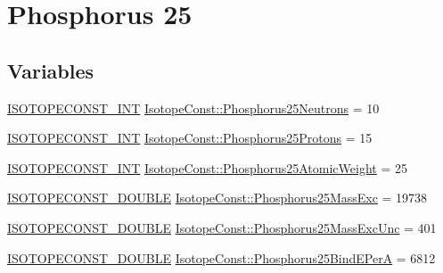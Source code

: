 \hypertarget{group___isotope_const-_phosphorus-_p25}{}\section{Phosphorus 25}
\label{group___isotope_const-_phosphorus-_p25}
\subsection*{Variables}
\begin{DoxyCompactItemize}
\item 
\mbox{\hyperlink{group___isotope_const-_macros_ga5f18360b3e99483a35c32d789e62621c}{I\+S\+O\+T\+O\+P\+E\+C\+O\+N\+S\+T\+\_\+\+I\+NT}} \mbox{\hyperlink{group___isotope_const-_phosphorus-_p25_ga174043ce307d1d3e2aba5b29657a9403}{Isotope\+Const\+::\+Phosphorus25\+Neutrons}} = 10
\item 
\mbox{\hyperlink{group___isotope_const-_macros_ga5f18360b3e99483a35c32d789e62621c}{I\+S\+O\+T\+O\+P\+E\+C\+O\+N\+S\+T\+\_\+\+I\+NT}} \mbox{\hyperlink{group___isotope_const-_phosphorus-_p25_ga80e4c9d7c91250db139273bf77041306}{Isotope\+Const\+::\+Phosphorus25\+Protons}} = 15
\item 
\mbox{\hyperlink{group___isotope_const-_macros_ga5f18360b3e99483a35c32d789e62621c}{I\+S\+O\+T\+O\+P\+E\+C\+O\+N\+S\+T\+\_\+\+I\+NT}} \mbox{\hyperlink{group___isotope_const-_phosphorus-_p25_ga40ed02d9787d031adb076afaa76d43f8}{Isotope\+Const\+::\+Phosphorus25\+Atomic\+Weight}} = 25
\item 
\mbox{\hyperlink{group___isotope_const-_macros_ga8f45a7272ce02c0b4c65c44636ed719a}{I\+S\+O\+T\+O\+P\+E\+C\+O\+N\+S\+T\+\_\+\+D\+O\+U\+B\+LE}} \mbox{\hyperlink{group___isotope_const-_phosphorus-_p25_ga3c2e94951ce2a847d5fe7a45ca7b48d3}{Isotope\+Const\+::\+Phosphorus25\+Mass\+Exc}} = 19738
\item 
\mbox{\hyperlink{group___isotope_const-_macros_ga8f45a7272ce02c0b4c65c44636ed719a}{I\+S\+O\+T\+O\+P\+E\+C\+O\+N\+S\+T\+\_\+\+D\+O\+U\+B\+LE}} \mbox{\hyperlink{group___isotope_const-_phosphorus-_p25_gae99510d1266b5da8f0795c7d077b4fc6}{Isotope\+Const\+::\+Phosphorus25\+Mass\+Exc\+Unc}} = 401
\item 
\mbox{\hyperlink{group___isotope_const-_macros_ga8f45a7272ce02c0b4c65c44636ed719a}{I\+S\+O\+T\+O\+P\+E\+C\+O\+N\+S\+T\+\_\+\+D\+O\+U\+B\+LE}} \mbox{\hyperlink{group___isotope_const-_phosphorus-_p25_gab417f39f1d1c8320ef5b78cb5c46d8e1}{Isotope\+Const\+::\+Phosphorus25\+Bind\+E\+PerA}} = 6812
\item 

\end{DoxyCompactItemize}
